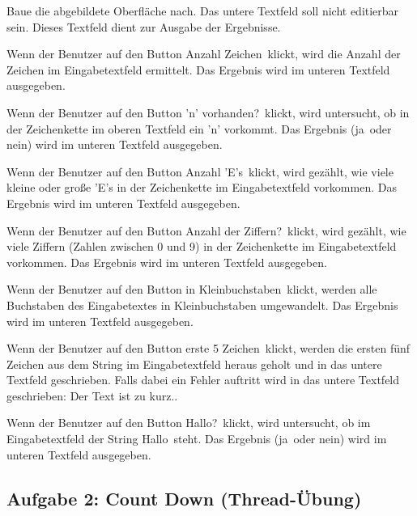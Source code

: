 \begin{compactenum}[a)]
\item Baue die abgebildete Oberfläche nach. Das untere Textfeld soll nicht
editierbar sein. Dieses Textfeld dient zur Ausgabe der Ergebnisse.

\item Wenn der Benutzer auf den Button \glqq Anzahl Zeichen\grqq\ klickt, wird
die Anzahl der Zeichen im Eingabetextfeld ermittelt. Das Ergebnis wird im
unteren Textfeld ausgegeben.

\item Wenn der Benutzer auf den Button \glqq 'n' vorhanden?\grqq\ klickt, wird
untersucht, ob in der Zeichenkette im oberen Textfeld ein 'n' vorkommt. Das
Ergebnis (\glqq ja\grqq\ oder \glqq nein\grqq ) wird im unteren Textfeld
ausgegeben.

\item Wenn der Benutzer auf den Button \glqq Anzahl 'E's\grqq\ klickt, wird
gezählt, wie viele kleine oder große 'E's in der Zeichenkette im Eingabetextfeld
vorkommen. Das Ergebnis wird im unteren Textfeld ausgegeben.

\item Wenn der Benutzer auf den Button \glqq Anzahl der Ziffern?\grqq\ klickt,
wird gezählt, wie viele Ziffern (Zahlen zwischen 0 und 9) in der Zeichenkette
im Eingabetextfeld vorkommen. Das Ergebnis wird im unteren Textfeld ausgegeben.

\item Wenn der Benutzer auf den Button \glqq in Kleinbuchstaben\grqq\ klickt,
werden alle Buchstaben des Eingabetextes in Kleinbuchstaben umgewandelt. Das
Ergebnis wird im unteren Textfeld ausgegeben.

\item Wenn der Benutzer auf den Button \glqq erste 5 Zeichen\grqq\ klickt,
werden die ersten fünf Zeichen aus dem String im Eingabetextfeld heraus geholt
und in das untere Textfeld geschrieben. Falls dabei ein Fehler auftritt wird in
das untere Textfeld geschrieben: \glqq Der Text ist zu kurz.\grqq .

\item Wenn der Benutzer auf den Button \glqq Hallo?\grqq\ klickt, wird
untersucht, ob im Eingabetextfeld der String \glqq Hallo\grqq\ steht. Das
Ergebnis (\glqq ja\grqq\ oder \glqq nein\grqq ) wird im unteren Textfeld
ausgegeben.
\end{compactenum}


\subsection{Aufgabe 2: Count Down (Thread-Übung)}

